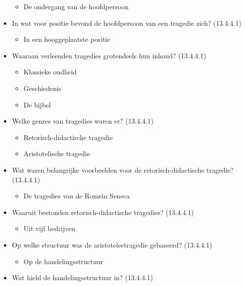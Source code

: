 \begin{itemize}
  \begin{itemize}
  \itemsep1pt\parskip0pt
  \item
    De ondergang van de hoofdpersoon
  \end{itemize}
\item
  In wat voor positie bevond de hoofdpersoon van een tragedie zich?
  (13.4.4.1)

  \begin{itemize}
  \itemsep1pt\parskip0pt
  \item
    In een hooggeplaatste positie
  \end{itemize}
\item
  Waaraan verleenden tragedies grotendeels hun inhoud? (13.4.4.1)

  \begin{itemize}
  \itemsep1pt\parskip0pt
  \item
    Klassieke oudheid
  \item
    Geschiedenis
  \item
    De bijbel
  \end{itemize}
\item
  Welke genres van tragedies waren er? (13.4.4.1)

  \begin{itemize}
  \itemsep1pt\parskip0pt
  \item
    Retorisch-didactische tragedie
  \item
    Aristotelische tragedie
  \end{itemize}
\item
  Wat waren belangrijke voorbeelden voor de retorisch-didactische
  tragedie? (13.4.4.1)

  \begin{itemize}
  \itemsep1pt\parskip0pt
  \item
    De tragedies van de Romein Seneca
  \end{itemize}
\item
  Waaruit bestonden retorisch-didactische tragedies? (13.4.4.1)

  \begin{itemize}
  \itemsep1pt\parskip0pt
  \item
    Uit vijf bedrijven
  \end{itemize}
\item
  Op welke structuur was de aristotelestragedie gebaseerd? (13.4.4.1)

  \begin{itemize}
  \itemsep1pt\parskip0pt
  \item
    Op de handelingsstructuur
  \end{itemize}
\item
  Wat hield de handelingsstructuur in? (13.4.4.1)


\end{itemize}
